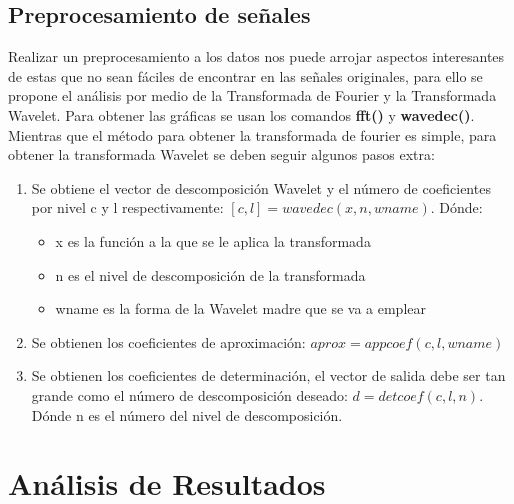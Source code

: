 \documentclass[11pt,a4paper]{article}
\begin{document}
\subsection{Preprocesamiento de señales}
Realizar un preprocesamiento a los datos nos puede arrojar aspectos interesantes de estas que no sean fáciles de encontrar en las señales originales, para ello se propone el análisis por medio de la Transformada de Fourier y la Transformada Wavelet. Para obtener las gráficas se usan los comandos \textbf{fft()} y \textbf{wavedec()}. Mientras que el método para obtener la transformada de fourier es simple, para obtener la transformada Wavelet se deben seguir algunos pasos extra:
\begin{enumerate}
	\item Se obtiene el vector de descomposición Wavelet y el número de coeficientes por nivel c y l respectivamente: $[c,l] = wavedec(x,n,wname)$. Dónde: 
	\begin{itemize}
		\item x es la función a la que se le aplica la transformada
		\item n es el nivel de descomposición de la transformada
		\item wname es la forma de la Wavelet madre que se va a emplear
	\end{itemize}
	\item Se obtienen los coeficientes de aproximación: $aprox = appcoef(c,l,wname)$
	\item Se obtienen los coeficientes de determinación, el vector de salida debe ser tan grande como el número de descomposición deseado: $d = detcoef(c,l,n)$. Dónde n es el número del nivel de descomposición.
\end{enumerate}

\section{Análisis de Resultados}
\end{document}
